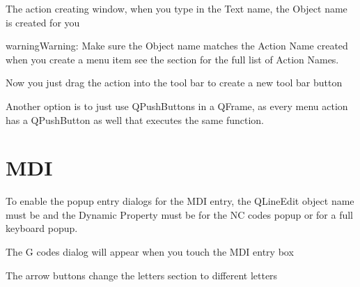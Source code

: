 \documentclass[letterpaper,10pt,english]{sphinxmanual}
\begin{document}

\sphinxAtStartPar
The action creating window, when you type in the Text name, the Object name is
created for you


\begin{sphinxadmonition}{warning}{Warning:}
\sphinxAtStartPar
Make sure the Object name matches the Action Name created when
you create a menu item \sphinxhyphen{} see the {\hyperref[\detokenize{menu::doc}]{}} section for the full list of
Action Names.
\end{sphinxadmonition}

\sphinxAtStartPar
Now you just drag the action into the tool bar to create a new tool bar button


\sphinxAtStartPar
Another option is to just use QPushButtons in a QFrame, as every menu action
has a QPushButton as well that executes the same function.


\section{MDI}
\label{\detokenize{touch:mdi}}
\sphinxAtStartPar
To enable the popup entry dialogs for the MDI entry, the QLineEdit object name
must be  and the Dynamic Property  must be  for
the NC codes popup or  for a full keyboard popup.

\sphinxAtStartPar
The G codes dialog will appear when you touch the MDI entry box


\sphinxAtStartPar
The arrow buttons change the letters section to different letters

\end{document}
